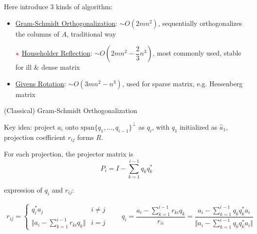         
    Here introduce 3 kinds of algorithm:
    \begin{itemize}[topsep=2pt,itemsep=0pt]
        \item \hyperlink{GS-Decomposition}{Gram-Schmidt Orthogonalization}: $ \sim O(2mn^2) $, sequentially orthogonalizes the columns of $ A $, traditional way
        \item[$ \color{red}\star $] \hyperlink{Householder-Reflection}{Householder Reflection}: $ \sim O(2mn^2-\dfrac{2}{3}n^3) $, most commonly used, stable for ill \& dense matrix
        \item \hyperlink{Givens-Rotation}{Givens Rotation}: $ \sim O(3mn^2-n^3) $, used for sparse matrix, e.g. Hessenberg matrix
    \end{itemize}
    
        




\begin{point}
    \hypertarget{GS-Decomposition}{(Classical) Gram-Schmidt Orthogonalization}
\end{point}

    Key idea: project $ a_i $ onto $ \mathrm{span}\{q_1,\ldots,q_{i-1}\}^\perp  $ as $ q_i $, with $ q_1 $ initialized as $ \hat{a}_1 $, projection coefficient $ r_{ij} $ forms $ R $.

    For each projection, the projector matrix is 
    \begin{equation}\label{EqaCGSProjector}
        P_i=I-\sum_{k=1}^{i-1}q_kq_k^*      
    \end{equation}
    
    expression of $ q_i $ and $ r_{ij} $: 

\begin{align}
    r_{ij}=\begin{cases}
        q_i^*a_j&i\neq j\\
        \Vert a_i-\sum_{k=1}^{i-1}r_{ki}q_k \Vert& i=j 
    \end{cases}\qquad 
    q_i=\dfrac{a_i-\sum_{k=1}^{i-1}r_{ki}q_k}{r_{ii}}=\dfrac{a_i-\sum_{k=1}^{i-1}q_kq_k^*a_i}{\Vert a_i-\sum_{k=1}^{i-1}q_kq_k^*a_i \Vert }
\end{align}

